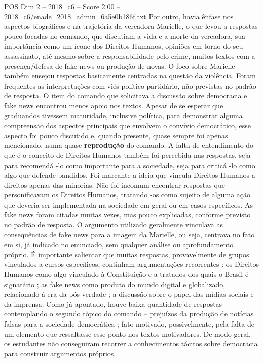 \begin{textsample}{POS Dim 2 – 2018\_c6 – Score 2.00 – 2018\_c6/enade\_2018\_admin\_6a5e0b186f.txt}
Por outro, havia ênfase nos aspectos biográficos e na trajetória da vereadora Marielle, o que levou a respostas pouco focadas no comando, que discutiam a vida e a morte da vereadora, sua importância como um ícone dos Direitos Humanos, opiniões em torno do seu assassinato, até mesmo sobre a responsabilidade pelo crime, muitos textos com a presença/defesa de fake news ou produção de novas.
O foco sobre Marielle também ensejou respostas basicamente centradas na questão da violência.
Foram frequentes as interpretações com viés político-partidário, não previstas no padrão de resposta.
O item do comando que solicitava a discussão sobre democracia e fake news encontrou menos apoio nos textos.
Apesar de se esperar que graduandos tivessem maturidade, inclusive política, para demonstrar alguma compreensão dos aspectos principais que envolvem o convívio democrático, esse aspecto foi pouco discutido e, quando presente, quase sempre foi apenas mencionado, numa quase \textbf{reprodução} do comando.
A falta de entendimento do que é o conceito de Direitos Humanos também foi percebida nas respostas, seja para recomendá -lo como importante para a sociedade, seja para criticá -lo como algo que defende bandidos.
Foi marcante a ideia que vincula Direitos Humanos a direitos apenas das minorias.
Não foi incomum encontrar respostas que personificavam os Direitos Humanos, tratando -os como sujeito de alguma ação que deveria ser implementada na sociedade em geral ou em casos específicos.
As fake news foram citadas muitas vezes, mas pouco explicadas, conforme previsto no padrão de resposta.
O argumento utilizado geralmente vinculava as consequências de fake news para a imagem da Marielle, ou seja, centrava no fato em si, já indicado no enunciado, sem qualquer análise ou aprofundamento próprio.
É importante salientar que muitas respostas, provavelmente de grupos vinculados a cursos específicos, continham argumentações recorrentes : os Direitos Humanos como algo vinculado à Constituição e a tratados dos quais o Brasil é signatário ; as fake news como produto do mundo digital e globalizado, relacionado à era da pós-verdade ; a discussão sobre o papel das mídias sociais e da imprensa.
Como já apontado, houve baixa quantidade de respostas contemplando o segundo tópico do comando – prejuízos da produção de notícias falsas para a sociedade democrática ; fato motivado, possivelmente, pela falta de um elemento que ressaltasse esse ponto nos textos motivadores.
De modo geral, os estudantes não conseguiram recorrer a conhecimentos tácitos sobre democracia para construir argumentos próprios.

\end{textsample}
